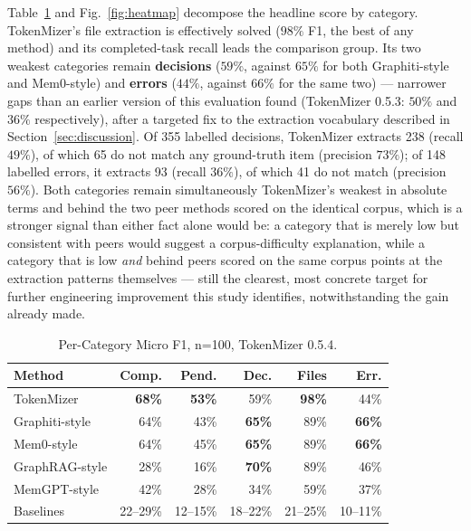 \documentclass[journal]{IEEEtran}
\begin{document}
Table~\ref{tab:category} and Fig.~\ref{fig:heatmap} decompose
the headline score by category.
TokenMizer's file extraction is effectively solved ($98\%$ F1,
the best of any method) and its completed-task recall leads
the comparison group. Its two weakest categories remain
\textbf{decisions} ($59\%$, against $65\%$ for both
Graphiti-style and Mem0-style) and \textbf{errors} ($44\%$,
against $66\%$ for the same two) --- narrower gaps than an
earlier version of this evaluation found (TokenMizer 0.5.3:
$50\%$ and $36\%$ respectively), after a targeted fix to the
extraction vocabulary described in
Section~\ref{sec:discussion}.
Of 355 labelled decisions, TokenMizer extracts 238 (recall
$49\%$), of which 65 do not match any ground-truth item
(precision $73\%$); of 148 labelled errors, it extracts 93
(recall $36\%$), of which 41 do not match
(precision $56\%$). Both categories remain simultaneously
TokenMizer's weakest in absolute terms and behind the two
peer methods scored on the identical corpus, which is a
stronger signal than either fact alone would be: a category
that is merely low but consistent with peers would suggest a
corpus-difficulty explanation, while a category that is low
\emph{and} behind peers scored on the same corpus points at
the extraction patterns themselves --- still the clearest,
most concrete target for further engineering improvement this
study identifies, notwithstanding the gain already made.

\begin{table}[t]
  \centering
  \caption{Per-Category Micro F1, n=100, TokenMizer 0.5.4.}
  \label{tab:category}
  \renewcommand{\arraystretch}{1.15}
  \begin{tabular}{@{}lrrrrr@{}}
    \toprule
    \textbf{Method} & \textbf{Comp.} & \textbf{Pend.} &
    \textbf{Dec.} & \textbf{Files} & \textbf{Err.} \\
    \midrule
    \rowcolor{rowours}
    TokenMizer      & \textbf{68\%} & \textbf{53\%} & 59\% & \textbf{98\%} & 44\% \\
    Graphiti-style  & 64\% & 43\% & \textbf{65\%} & 89\% & \textbf{66\%} \\
    Mem0-style      & 64\% & 45\% & \textbf{65\%} & 89\% & \textbf{66\%} \\
    GraphRAG-style  & 28\% & 16\% & \textbf{70\%} & 89\% & 46\% \\
    MemGPT-style    & 42\% & 28\% & 34\% & 59\% & 37\% \\
    Baselines       & 22--29\% & 12--15\% & 18--22\% & 21--25\% & 10--11\% \\
    \bottomrule
  \end{tabular}
\end{table}
\end{document}
